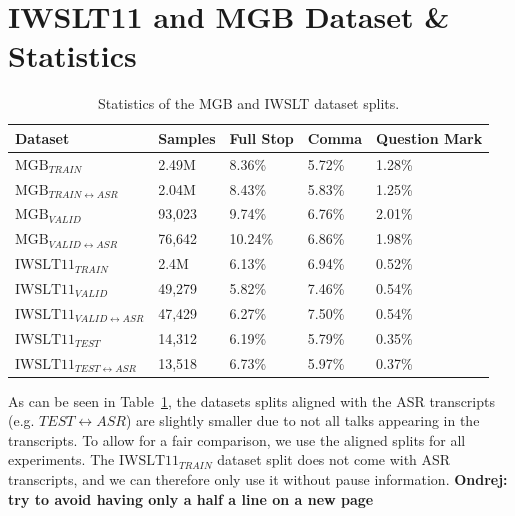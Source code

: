 \documentclass[bsc,deptreport,ai]{infthesis} %
\newcommand{\Ondrej}[1]{{\color{red} \textbf{Ondrej: #1}}}
\begin{document}
\section{IWSLT11 and MGB Dataset \& Statistics}
\label{sec:notrain}
\begin{table}[h]
\begin{sc}
\begin{tabular}{@{}lllll@{}}
\toprule
\textbf{Dataset}                                & \textbf{Samples}               & \textbf{Full Stop} & \textbf{Comma} & \textbf{Question Mark} \\ \midrule
\multicolumn{1}{l|}{$\text{MGB}_{TRAIN}$}            & \multicolumn{1}{l|}{2.49M}          &   8.36\%                &         5.72\%       &    1.28\%                     \\
\multicolumn{1}{l|}{$\text{MGB}_{TRAIN \leftrightarrow ASR}$}     & \multicolumn{1}{l|}{2.04M}          &   8.43\%            &   5.83\%            &     1.25\%            \\
\multicolumn{1}{l|}{$\text{MGB}_{VALID}$}            & \multicolumn{1}{l|}{93,023}          &  9.74\%                  &       6.76\%         &          2.01\%              \\
\multicolumn{1}{l|}{$\text{MGB}_{VALID\leftrightarrow ASR}$}            & \multicolumn{1}{l|}{76,642} &       10.24\%             &   6.86\%             &         1.98\%               \\ \midrule
\multicolumn{1}{l|}{$\text{IWSLT11}_{TRAIN}$}        & \multicolumn{1}{l|}{2.4M}          &    6.13\%                 &        6.94\%        &      0.52\%                   \\
\multicolumn{1}{l|}{$\text{IWSLT11}_{VALID}$}        & \multicolumn{1}{l|}{49,279}          &  5.82\%                   &        7.46\%        &       0.54\%                 \\
\multicolumn{1}{l|}{$\text{IWSLT11}_{VALID\leftrightarrow ASR}$} & \multicolumn{1}{l|}{47,429}          &     6.27\%              &         7.50\%        &        0.54\%              \\
\multicolumn{1}{l|}{$\text{IWSLT11}_{TEST}$}         & \multicolumn{1}{l|}{14,312}          & 6.19\%                   &       5.79\%         &         0.35\%               \\
\multicolumn{1}{l|}{$\text{IWSLT11}_{TEST\leftrightarrow ASR}$}  & \multicolumn{1}{l|}{13,518}          &   6.73\%                 &      5.97\%          &     0.37\%                   \\ \bottomrule
\end{tabular}
\end{sc}
\caption{Statistics of the MGB and IWSLT dataset splits.}
\label{tab:datasetstat}
\end{table}
As can be seen in Table~\ref{tab:datasetstat}, the datasets splits aligned with the ASR transcripts (e.g. $TEST\leftrightarrow ASR$) are slightly smaller due to not all talks appearing in the transcripts. To allow for a fair comparison, we use the aligned splits for all experiments. The $\text{IWSLT11}_{TRAIN}$ dataset split does not come with ASR transcripts, and we can therefore only use it without pause information. \Ondrej{try to avoid having only a half a line on a new page}
\end{document}
